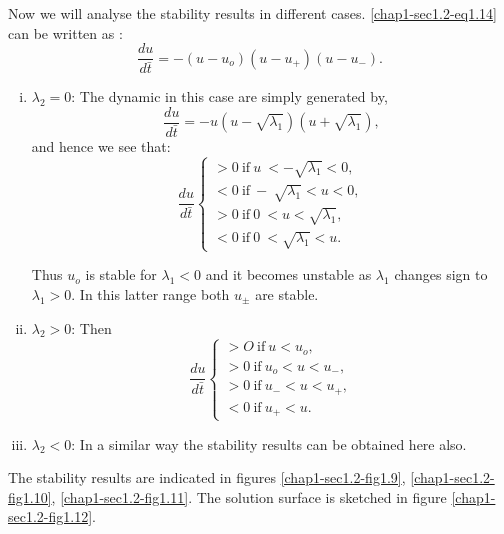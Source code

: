 Now we will analyse the stability results in different
cases. \eqref{chap1-sec1.2-eq1.14} can be written as : 
\begin{equation*}
\frac{du}{d \bar{t}} = - (u-u_{o})
(u-u_{+})(u-u_{-}). \tag{1.18}\label{chap1-sec1.2-eq1.18} 
\end{equation*}\pageoriginale
\begin{enumerate}[(i)]
\item $\lambda_{2} = 0$: The dynamic in this case are simply generated
  by,  
\begin{equation*}
\frac{du}{d \bar{t}} = -u(u- \sqrt{\lambda_{1}}) (u +
\sqrt{\lambda_{1}}), \tag{1.19}\label{chap1-sec1.2-eq1.19} 
\end{equation*}
and hence we see that:
\begin{equation*}
\frac{du}{d \bar{t}} \tag{1.20}
\begin{cases}
> 0 ~\text{if} ~ u ~ < - \sqrt{\lambda_{1}} < 0, \\
< 0 ~\text{if} ~ - ~ \sqrt{\lambda_{1}}< u < 0,\\
> 0 ~\text{if} ~ 0 ~ < u < \sqrt{\lambda_{1}}, \\
< 0 ~\text{if} ~ 0 ~ < \sqrt{\lambda_{1}} < u.
\end{cases}\label{chap1-sec1.2-eq1.20}
\end{equation*}

Thus $u_{o}$ is stable for $\lambda_{1} < 0$ and it becomes unstable
as $\lambda_{1}$ changes sign to $\lambda_{1} > 0$. In this latter
range both $u_{\pm}$ are stable. 

\item $\lambda_{2} > 0$: Then
\begin{equation*}
\frac{du}{d \bar{t}} \tag{1.21}
\begin{cases}
> O ~\text{if}~ u < u_{o}, \\
> 0 ~\text{if}~ u_{o} < u < u_{-},\\
> 0 ~\text{if}~ u_{-} < u < u_{+},\\
< 0 ~\text{if}~ u_{+} < u.
\end{cases}\label{chap1-sec1.2-eq1.21}
\end{equation*}

\item $\lambda_{2} < 0$: In a similar way the stability results can be
  obtained here also. 
\end{enumerate}

The stability results are indicated in figures
\ref{chap1-sec1.2-fig1.9}, \ref{chap1-sec1.2-fig1.10},
\ref{chap1-sec1.2-fig1.11}. The 
solution surface is sketched in figure \ref{chap1-sec1.2-fig1.12}.  

